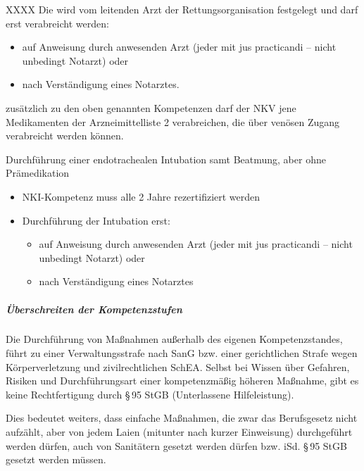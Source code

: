 {\begin{labeling}[~:]{XXXX}
  Die  wird vom leitenden
  Arzt der Rettungsorganisation festgelegt und darf erst
  verabreicht werden:
  \begin{itemize}
    \item auf Anweisung durch anwesenden Arzt (jeder mit jus
    practicandi -- nicht unbedingt Notarzt) oder
    \item nach Verständigung eines Notarztes.
  \end{itemize}
  \item[\T{NKV}]  zusätzlich zu den oben genannten
  Kompetenzen darf der NKV jene Medikamenten der Arzneimittelliste 2 verabreichen, die über venösen Zugang verabreicht werden können.
  \item[\T{NKI}] 
     Durchführung einer endotrachealen Intubation samt Beatmung, aber ohne
     Prämedikation
     \begin{itemize}
       \item
       NKI-Kompetenz muss alle 2 Jahre rezertifiziert werden
       \item
       Durchführung der Intubation erst:
       \begin{itemize}
         \item
         auf Anweisung durch anwesenden Arzt (jeder mit jus practicandi -- nicht unbedingt Notarzt) oder
         \item
         nach Verständigung eines Notarztes
       \end{itemize}
     \end{itemize}
\end{labeling}

\subparagraph{Überschreiten der Kompetenzstufen}
Die Durchführung von Maßnahmen außerhalb des eigenen
Kompetenzstandes, führt zu einer Verwaltungsstrafe nach SanG bzw.
einer gerichtlichen Strafe wegen Körperverletzung und
zivilrechtlichen SchEA. Selbst bei Wissen über Gefahren, Risiken und
Durchführungsart einer kompetenzmäßig höheren Maßnahme,
gibt es keine Rechtfertigung durch {\S}\,95 StGB (Unterlassene
Hilfeleistung).

Dies bedeutet weiters, dass einfache Maßnahmen, die zwar das
Berufsgesetz nicht aufzählt, aber von jedem Laien (mitunter nach
kurzer Einweisung) durchgeführt werden dürfen, auch von
Sanitätern gesetzt werden dürfen bzw. iSd. {\S}\,95 StGB gesetzt
werden müssen.
}{}{}{}{}




